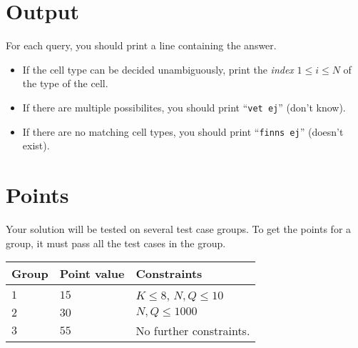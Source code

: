 \section*{Output}
For each query, you should print a line containing the answer.

\begin{itemize}
  \item If the cell type can be decided unambiguously, print the \textit{index} $1 \leq i \leq N$ of the type of the cell.
  \item If there are multiple possibilites, you should print ``\texttt{vet ej}'' (don't know).
  \item If there are no matching cell types, you should print ``\texttt{finns ej}'' (doesn't exist).
\end{itemize}

\section*{Points}
Your solution will be tested on several test case groups.
To get the points for a group, it must pass all the test cases in the group.

\noindent
\begin{tabular}{| l | l | p{12cm} |}
  \hline
  \textbf{Group} & \textbf{Point value} & \textbf{Constraints} \\ \hline
  $1$     & $15$         & $ K \le 8$, $N, Q \leq 10$\\ \hline
  $2$     & $30$         & $ N, Q \leq 1000$\\ \hline
  $3$     & $55$         & No further constraints.\\ \hline
\end{tabular}

